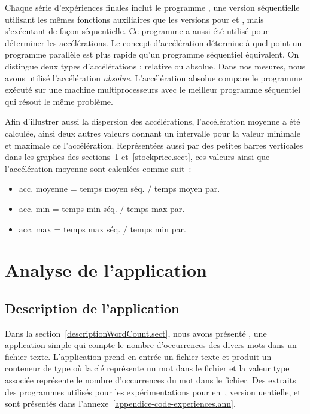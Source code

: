Chaque s\'erie d'exp\'eriences finales inclut le programme , une version s\'equentielle utilisant les m\^emes fonctions auxiliaires que les versions pour  et , mais s'ex\'ecutant de fa\c{c}on s\'equentielle. Ce programme a aussi \'et\'e utilis\'e pour d\'eterminer les acc\'el\'erations. Le concept d'acc\'el\'eration d\'etermine \`a quel point un programme parall\`ele est plus rapide qu'un programme s\'equentiel \'equivalent. On distingue deux types d'acc\'elérations : relative ou absolue. Dans nos mesures, nous avons utilis\'e l'acc\'el\'eration \emph{absolue}. L'acc\'el\'eration absolue compare le programme ex\'ecut\'e sur une machine multiprocesseurs avec le meilleur programme s\'equentiel qui r\'esout le m\^eme probl\`eme. 

Afin d'illustrer aussi la dispersion des acc\'el\'erations, l'accélération moyenne a été calculée, ainsi deux autres valeurs donnant un intervalle pour la valeur minimale et maximale de l'acc\'el\'eration. Repr\'esent\'ees aussi par des petites barres verticales dans les graphes des sections~\ref{wordcount.sect} et~\ref{stockprice.sect}, ces valeurs ainsi que l'accélération moyenne sont calcul\'ees comme suit~: 

\begin{itemize}
\item acc. moyenne  =  temps moyen séq. / temps moyen par.
\item acc. min  =  temps min séq. / temps max par.
\item acc. max = temps max séq. / temps min par.
\end{itemize}

\section{Analyse de l'application }
\label{wordcount.sect}



\subsection{Description de l'application }

Dans la section~\ref{descriptionWordCount.sect}, nous avons pr\'esent\'e , une application simple qui compte le nombre d'occurrences des divers mots dans un fichier texte. L'application prend en entr\'ee un fichier texte et produit un conteneur de type  où la cl\'e repr\'esente un mot dans le fichier et la valeur  type   associ\'ee repr\'esente le nombre d'occurrences du mot dans le fichier. Des extraits des programmes utilis\'es pour les exp\'erimentations pour  en~,  version uentielle,  et  sont pr\'esent\'es dans l'annexe~\ref{appendice-code-experiences.ann}.

